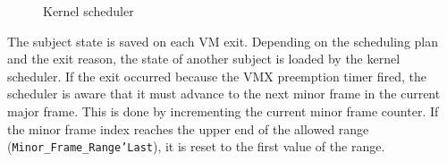 \begin{figure}[h]
	\centering
	
	\caption{Kernel scheduler}
	\label{fig:kernel-scheduler}
\end{figure}

The subject state is saved on each VM exit. Depending on the scheduling plan and
the exit reason, the state of another subject is loaded by the kernel scheduler.
If the exit occurred because the VMX preemption timer fired, the scheduler is
aware that it must advance to the next minor frame in the current major frame.
This is done by incrementing the current minor frame counter. If the minor frame
index reaches the upper end of the allowed range
(\texttt{Minor\_Frame\_Range'Last}), it is reset to the first value of the
range.

